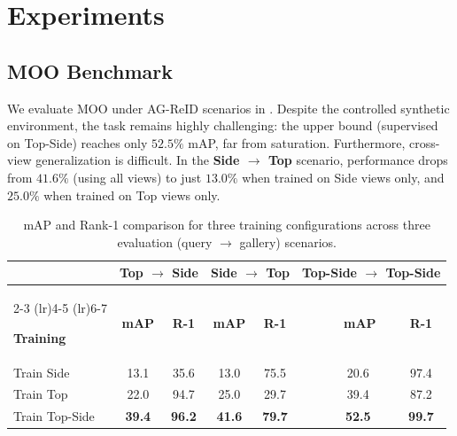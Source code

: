 \section{Experiments}
\label{sec:experiments}

\subsection{MOO Benchmark}
\label{subsec:_benchmark}

We evaluate MOO under AG-ReID scenarios in .
Despite the controlled synthetic environment, the task remains highly challenging: the upper bound (supervised on Top-Side) reaches only $52.5\%$ mAP, far from saturation.
Furthermore, cross-view generalization is difficult.
In the \textbf{Side $\to$ Top} scenario, performance drops from $41.6\%$ (using all views) to just $13.0\%$ when trained on Side views only, and $25.0\%$ when trained on Top views only.

\begin{table}[tbp]
    \centering
    \caption{
        mAP and Rank-1 comparison for three training configurations across three evaluation (query $\rightarrow$ gallery) scenarios.
    }
    \label{tab:benchmark}

    \scriptsize

    \begin{tabular}{l cc cc cc}
        \toprule

        & \multicolumn{2}{c}{\textbf{Top $\rightarrow$ Side}}
        & \multicolumn{2}{c}{\textbf{Side $\rightarrow$ Top}}
        & \multicolumn{2}{c}{\textbf{Top-Side $\rightarrow$ Top-Side}} \\

        \cmidrule(lr){2-3} \cmidrule(lr){4-5} \cmidrule(lr){6-7}

        \textbf{Training}
        & \textbf{mAP} & \textbf{R-1}
        & \textbf{mAP} & \textbf{R-1}
        & \textbf{~~~~mAP} & \textbf{R-1} \\

        \midrule

        Train Side
        & 13.1 & 35.6
        & 13.0 & 75.5
        & ~~~~20.6 & 97.4 \\

        Train Top
        & 22.0 & 94.7
        & 25.0 & 29.7
        & ~~~~39.4 & 87.2 \\

        Train Top-Side
        & \textbf{39.4} & \textbf{96.2}
        & \textbf{41.6} & \textbf{79.7}
        & ~~~~\textbf{52.5} & \textbf{99.7} \\

        \bottomrule
    \end{tabular}
\end{table}

